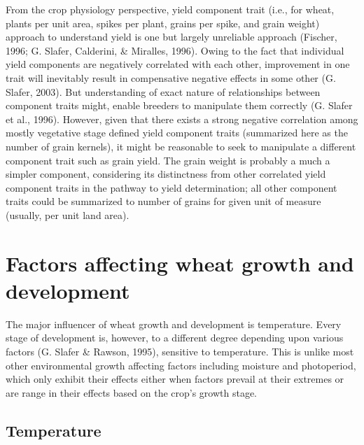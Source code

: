\documentclass[12pt,oneside]{dukestatscithesis} %
\theoremstyle{definition}
\theoremstyle{definition}
\theoremstyle{definition}
\theoremstyle{remark}
\begin{document}
From the crop physiology perspective, yield component trait (i.e., for
wheat, plants per unit area, spikes per plant, grains per spike, and
grain weight) approach to understand yield is one but largely unreliable
approach (Fischer, 1996; G. Slafer, Calderini, \& Miralles, 1996). Owing
to the fact that individual yield components are negatively correlated
with each other, improvement in one trait will inevitably result in
compensative negative effects in some other (G. Slafer, 2003). But
understanding of exact nature of relationships between component traits
might, enable breeders to manipulate them correctly (G. Slafer et al.,
1996). However, given that there exists a strong negative correlation
among mostly vegetative stage defined yield component traits (summarized
here as the number of grain kernels), it might be reasonable to seek to
manipulate a different component trait such as grain yield. The grain
weight is probably a much a simpler component, considering its
distinctness from other correlated yield component traits in the pathway
to yield determination; all other component traits could be summarized
to number of grains for given unit of measure (usually, per unit land
area).

\section{Factors affecting wheat growth and
development}\label{factors-affecting-wheat-growth-and-development}

The major influencer of wheat growth and development is temperature.
Every stage of development is, however, to a different degree depending
upon various factors (G. Slafer \& Rawson, 1995), sensitive to
temperature. This is unlike most other environmental growth affecting
factors including moisture and photoperiod, which only exhibit their
effects either when factors prevail at their extremes or are range in
their effects based on the crop's growth stage.

\subsection{Temperature}\label{temperature}
\end{document}
